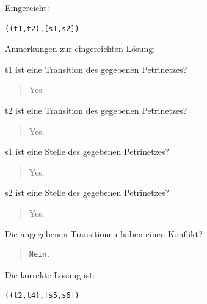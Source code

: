 Eingereicht:


\begin{verbatim}
((t1,t2),[s1,s2])
\end{verbatim}


Anmerkungen zur eingereichten Lösung:

t1 ist eine Transition des gegebenen Petrinetzes?\begin{quote}Yes.\end{quote}t2 ist eine Transition des gegebenen Petrinetzes?\begin{quote}Yes.\end{quote}s1 ist eine Stelle des gegebenen Petrinetzes?\begin{quote}Yes.\end{quote}s2 ist eine Stelle des gegebenen Petrinetzes?\begin{quote}Yes.\end{quote}Die angegebenen Transitionen haben einen Konflikt?

\begin{quote}
\begin{verbatim}
Nein.
\end{verbatim}
\end{quote}

Die korrekte Lösung ist:
\begin{verbatim}
((t2,t4),[s5,s6])
\end{verbatim}


